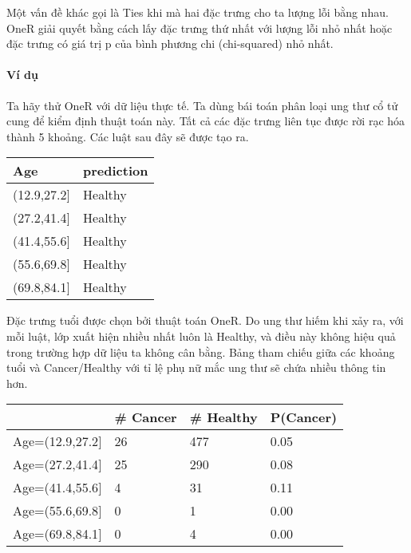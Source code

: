 Một vấn đề khác gọi là Ties khi mà hai đặc trưng cho ta lượng lỗi bằng nhau. OneR giải quyết bằng cách lấy đặc trưng thứ nhất với lượng lỗi nhỏ nhất hoặc đặc trưng có giá trị p của bình phương chi (chi-squared) nhỏ nhất.

\paragraph{Ví dụ}

Ta hãy thử OneR với dữ liệu thực tế. Ta dùng bái toán phân loại ung thư cổ tử cung để kiểm định thuật toán này. Tất cả các đặc trưng liên tục được rời rạc hóa thành 5 khoảng. Các luật sau đây sẽ được tạo ra.

\begin{table*}[hbt!]
\centering
\begin{tabular}{|l|l|}
\hline
\textbf{Age}  & \textbf{prediction} \\ \hline
(12.9,27.2{]} & Healthy             \\ \hline
(27.2,41.4{]} & Healthy             \\ \hline
(41.4,55.6{]} & Healthy             \\ \hline
(55.6,69.8{]} & Healthy             \\ \hline
(69.8,84.1{]} & Healthy             \\ \hline
\end{tabular}
\end{table*}

Đặc trưng tuổi được chọn bởi thuật toán OneR. Do ung thư hiếm khi xảy ra, với mỗi luật, lớp xuất hiện nhiều nhất luôn là Healthy, và điều này không hiệu quả trong trường hợp dữ liệu ta không cân bằng. Bảng tham chiếu giữa các khoảng tuổi và Cancer/Healthy với tỉ lệ phụ nữ mắc ung thư sẽ chứa nhiều thông tin hơn.

\begin{table*}[hbt!]
\centering
\begin{tabular}{|l|l|l|l|}
\hline
                  & \textbf{\# Cancer} & \textbf{\# Healthy} & \textbf{P(Cancer)} \\ \hline
Age=(12.9,27.2{]} & 26                 & 477                 & 0.05               \\ \hline
Age=(27.2,41.4{]} & 25                 & 290                 & 0.08               \\ \hline
Age=(41.4,55.6{]} & 4                  & 31                  & 0.11               \\ \hline
Age=(55.6,69.8{]} & 0                  & 1                   & 0.00               \\ \hline
Age=(69.8,84.1{]} & 0                  & 4                   & 0.00               \\ \hline
\end{tabular}
\end{table*}

